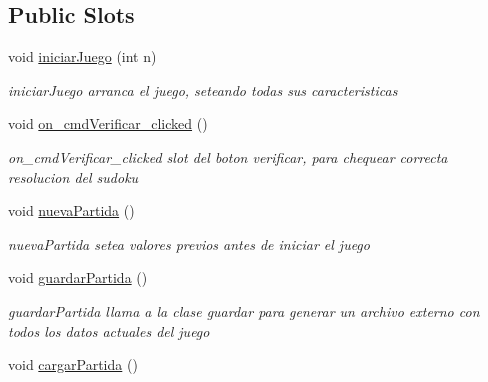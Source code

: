 \subsection*{Public Slots}
\begin{DoxyCompactItemize}
\item 
void \hyperlink{class_main_table_a7e0baffddf06ead228a33f014a4aef63}{iniciar\-Juego} (int n)
\begin{DoxyCompactList}\small\item\em iniciar\-Juego arranca el juego, seteando todas sus caracteristicas \end{DoxyCompactList}\item 
\hypertarget{class_main_table_aab955ede8537f643e3ac7c3b148c63b6}{void \hyperlink{class_main_table_aab955ede8537f643e3ac7c3b148c63b6}{on\-\_\-cmd\-Verificar\-\_\-clicked} ()}\label{class_main_table_aab955ede8537f643e3ac7c3b148c63b6}

\begin{DoxyCompactList}\small\item\em on\-\_\-cmd\-Verificar\-\_\-clicked slot del boton verificar, para chequear correcta resolucion del sudoku \end{DoxyCompactList}\item 
\hypertarget{class_main_table_a9eee831277d1dd818595ec56f9ad3fe9}{void \hyperlink{class_main_table_a9eee831277d1dd818595ec56f9ad3fe9}{nueva\-Partida} ()}\label{class_main_table_a9eee831277d1dd818595ec56f9ad3fe9}

\begin{DoxyCompactList}\small\item\em nueva\-Partida setea valores previos antes de iniciar el juego \end{DoxyCompactList}\item 
\hypertarget{class_main_table_acdbfd9b75edc0b2c77edf56b577f00ed}{void \hyperlink{class_main_table_acdbfd9b75edc0b2c77edf56b577f00ed}{guardar\-Partida} ()}\label{class_main_table_acdbfd9b75edc0b2c77edf56b577f00ed}

\begin{DoxyCompactList}\small\item\em guardar\-Partida llama a la clase guardar para generar un archivo externo con todos los datos actuales del juego \end{DoxyCompactList}\item 
\hypertarget{class_main_table_aae9be0974d1533c6cfd1ee55cf534b46}{void \hyperlink{class_main_table_aae9be0974d1533c6cfd1ee55cf534b46}{cargar\-Partida} ()}\label{class_main_table_aae9be0974d1533c6cfd1ee55cf534b46}


\end{DoxyCompactItemize}
